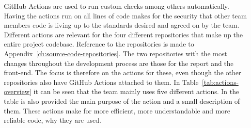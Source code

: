 GitHub Actions are used to run custom checks among others automatically.
Having the actions run on all lines of code makes for the security that other team members code is living up to the
standards desired and agreed on by the team.
Different actions are relevant for the four different repositories that make up the entire project codebase.
Reference to the repositories is made to Appendix~\ref{ch:source-code-repositories}.
The two repositories with the most changes throughout the development process are those for the report and the
front-end.
The focus is therefore on the actions for these, even though the other repositories also have GitHub Actions
attached to them.
In Table~\ref{tab:actions-overview} it can be seen that the team mainly uses five different actions.
In the table is also provided the main purpose of the action and a small description of them.
These actions make for more efficient, more understandable and more reliable code, why they are used.


